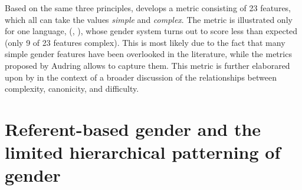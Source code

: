 \documentclass[output=collectionpaper]{langsci/langscibook}
\begin{document}
Based on the same three principles, \cite{Audring2017} develops a metric consisting of 23 features, which all can take the values \emph{simple} and \emph{complex}. The metric is illustrated only for one language,  (, ), whose gender system turns out to score less than expected (only 9 of 23 features complex). This is most likely due to the fact that many simple gender features have been overlooked in the literature, while the metrics proposed by Audring allows to capture them. This metric is further elaborared upon by  in the context of a broader discussion of the relationships between complexity, canonicity, and difficulty.

\section{Referent-based gender and the limited hierarchical patterning of gender}
\label{sec:WDG:3}
\end{document}
